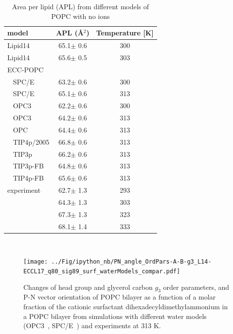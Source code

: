 \documentclass[journal=jpcbfk]{achemso}
\begin{document}
\begin{table}[!h]
  \caption{Area per lipid (APL) from different models of POPC with no ions\label{tab:apls_si} }
  \begin{tabular}{l|c c}
    model          & APL (\AA$^2$)   & Temperature [K] \\
    \hline
    Lipid14                   & 65.1$\pm$ 0.6  &  300 \\
    Lipid14 \cite{dickson14}  & 65.6$\pm$ 0.5  &  303 \\
    \hline
    ECC-POPC &        &  \\
    ~ SPC/E          & 63.2$\pm$ 0.6   &  300       \\
    ~ SPC/E          & 65.1$\pm$ 0.6   &  313       \\
    ~ OPC3           & 62.2$\pm$ 0.6   &  300       \\
    ~ OPC3           & 64.2$\pm$ 0.6   &  313       \\
    ~ OPC            & 64.4$\pm$ 0.6   &  313       \\
    ~ TIP4p/2005     & 66.8$\pm$ 0.6   &  313       \\
    ~ TIP3p          & 66.2$\pm$ 0.6   &  313       \\
    ~ TIP3p-FB       & 64.8$\pm$ 0.6   &  313       \\
    ~ TIP4p-FB       & 65.6$\pm$ 0.6   &  313       \\
    \hline
    experiment \cite{kucerka11}  & 62.7$\pm$ 1.3  &  293    \\
                                 & 64.3$\pm$ 1.3  &  303    \\
                                 & 67.3$\pm$ 1.3  &  323    \\
                                 & 68.1$\pm$ 1.4  &  333    \\
    \hline
  \end{tabular} \\
\end{table}


\begin{figure}[!hp]
  \centering
  \texttt{[image: ../Fig/ipython\_nb/PN\_angle\_OrdPars-A-B-g3\_L14-ECCL17\_q80\_sig89\_surf\_waterModels\_compar.pdf]}
  \caption{\label{fig:ordPars_waterModels_surf}
    Changes of head group and glycerol carbon $g_3$ order parameters, and P-N vector orientation of POPC bilayer
    as a function of a molar fraction of the cationic surfactant dihexadecyldimethylammonium in a POPC bilayer
    from simulations with different water models (OPC3~\cite{Izadi16}, SPC/E~\cite{Berendsen1987})
    and experiments \cite{scherer89} at 313 K.
  }
\end{figure}
\end{document}
